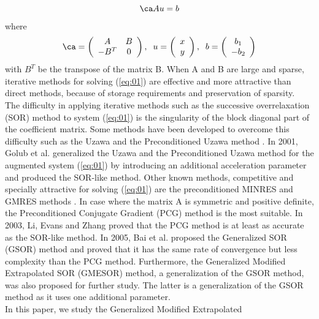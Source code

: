 \documentclass{report}
\begin{document}
\begin{equation}
\ca Au=b\label{eq:01}
\end{equation}
where
\begin{equation}\label{eq:02}
\ca=\left(
\begin{array}{cc}
A & B\\
-B^{T} & 0
\end{array}
\right), \;\; u=
\left(
\begin{array}{cc}
x\\
y
\end{array}
\right),\;\; b=
\left(
\begin{array}{cc}
b_1\\
-b_2
\end{array}
\right)
\end{equation}
with $B^T$ be the transpose of the matrix B.
When A and B are large and sparse, iterative methods for solving
(\ref{eq:01}) are effective and more attractive than direct methods,
because of storage requirements and preservation of sparsity.
\\ \noindent The difficulty in applying iterative methods such as the
successive overrelaxation (SOR) method \cite{Young} to system
(\ref{eq:01}) is the singularity of the block diagonal part of the
coefficient matrix. Some methods have been developed to overcome this
difficulty such as the Uzawa and the Preconditioned Uzawa method
\cite{ArHurUz58}. In 2001, Golub et al. \cite{GolWuYuan2001} generalized
the Uzawa and the Preconditioned Uzawa method for the augmented system
(\ref{eq:01}) by introducing an additional acceleration parameter and
produced the SOR-like method. Other known methods, competitive and
specially attractive for solving (\ref{eq:01}) are the preconditioned
MINRES and GMRES methods \cite{FiRaSiWa98}. In case where the matrix A is
symmetric and positive definite, the Preconditioned Conjugate Gradient
(PCG) method \cite{HestSt52} is the most suitable. In 2003, Li, Evans and
Zhang \cite{LiEvansZha2003} proved that the PCG method is at least as
accurate as the SOR-like method. In 2005, Bai et al.
\cite{BaiParlWang2005} proposed the Generalized SOR (GSOR) method and
proved that it has the same rate of convergence but less complexity than
the PCG method. Furthermore, the Generalized Modified Extrapolated SOR
(GMESOR) method, a generalization of the GSOR method, was also proposed
for further study.
The latter is a generalization of the GSOR method as it uses one additional parameter. \\
\noindent In this paper, we study the Generalized Modified Extrapolated
\end{document}
